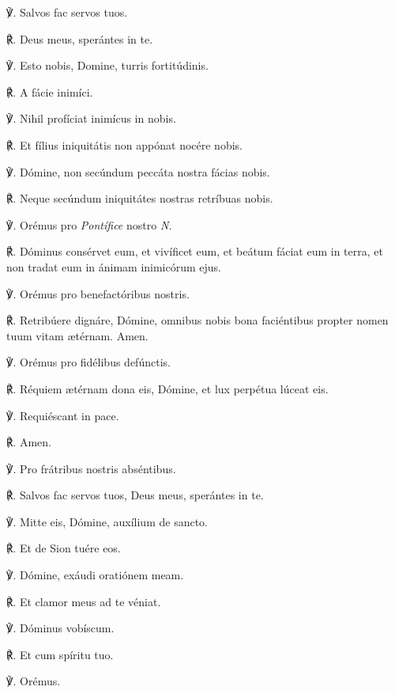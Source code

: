 {℣. Salvos fac servos tuos.\par
℟. Deus meus, sperántes in te.\par
℣. Esto nobis, Domine, turris fortitúdinis.\par
℟. A fácie inimíci.\par
℣. Nihil profíciat inimícus in nobis.\par
℟. Et fílius iniquitátis non appónat nocére nobis.\par
℣. Dómine, non secúndum peccáta nostra fácias nobis.\par
℟. Neque secúndum iniquitátes nostras retríbuas nobis.\par
℣. Orémus pro \textit{Pontífice} nostro \textit{N.}\par
℟. Dóminus consérvet eum, et vivíficet eum, et beátum fáciat eum in terra, et non tradat eum in ánimam inimicórum ejus.\par
℣. Orémus pro benefactóribus nostris.\par
℟. Retribúere dignáre, Dómine, omnibus nobis bona faciéntibus propter nomen tuum vitam {\ae}térnam. Amen.\par
℣. Orémus pro fidélibus defúnctis.\par
℟. Réquiem {\ae}térnam dona eis, Dómine, et lux perpétua lúceat eis.\par
℣. Requiéscant in pace.\par
℟. Amen.\par
℣. Pro frátribus nostris abséntibus.\par
℟. Salvos fac servos tuos, Deus meus, sperántes in te.\par
℣. Mitte eis, Dómine, auxílium de sancto.\par
℟. Et de Sion tuére eos.\par
℣. Dómine, exáudi oratiónem meam.\par
℟. Et clamor meus ad te véniat.\par
℣. Dóminus vobíscum.\par
℟. Et cum spíritu tuo.\par
℣. Orémus.}



